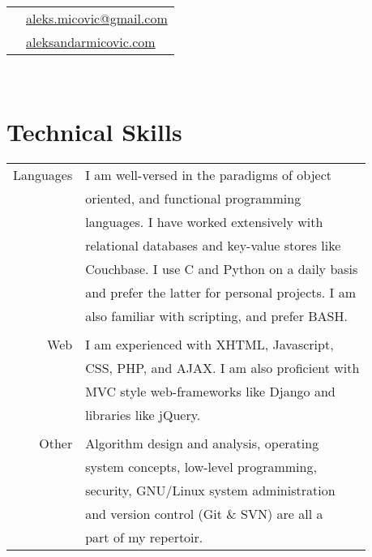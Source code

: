 \documentclass[10pt]{article}
\begin{document}
\hfill
\begin{minipage}[t]{0.44\textwidth}

    \vspace{0pt}
	
\colorbox{shade}{\textcolor{text1}{
    \begin{tabular}{c|p{7cm}}
        \raisebox{-3pt}{\Envelope}
        &\href{mailto:aleks.micovic@gmail.com}{aleks.micovic@gmail.com}\\
		\raisebox{-3pt}{\PencilRightDown}
		&\href{http://aleksandarmicovic.com}{aleksandarmicovic.com}
	\end{tabular}}}\\[10pt]

\section{Technical Skills}
    \begin{tabular}{rl}
    Languages &  I am well-versed in the paradigms of object\\
              &  oriented, and functional programming\\
              &  languages. I have worked extensively with\\
              &  relational databases and key-value stores like\\
              &  Couchbase. I use C and Python on a daily basis\\
              &  and prefer the latter for personal projects. I am\\ 
              &  also familiar with scripting, and prefer BASH.\\ 
              \\
 	  Web &  I am experienced with XHTML, Javascript,\\
              &  CSS, PHP, and AJAX. I am also proficient with\\ 
              &  MVC style web-frameworks like Django and\\
              &  libraries like jQuery.\\
              \\
        Other &  Algorithm design and analysis, operating\\
              &  system concepts, low-level programming, \\
              &  security, GNU/Linux system administration\\
              &  and version control (Git \& SVN) are all a\\ 
              &  part of my repertoir.\\
    \end{tabular}\\[10pt]


\end{minipage}
\end{document}
